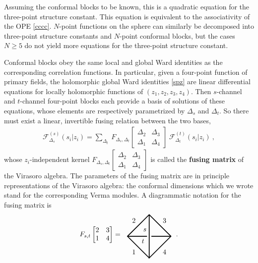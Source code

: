 \documentclass[12pt, a4paper, notitlepage, twoside]{report}
\numberwithin{equation}{section}
\theoremstyle{break}
\begin{document}
Assuming the conformal blocks to be known, this is a quadratic equation for the three-point structure constant.
This equation is equivalent to the associativity of the OPE \eqref{cccc}. $N$-point functions on the sphere can similarly be decomposed into three-point structure constants and $N$-point conformal blocks, but the cases $N\geq 5$ do not yield more equations for the three-point structure constant. 

Conformal blocks obey the same local and global Ward identities as the corresponding correlation functions.
In particular, given a four-point function of primary fields, the holomorphic global Ward identities \eqref{spz} are linear differential equations for locally holomorphic functions of $(z_1,z_2,z_3,z_4)$.
Then
$s$-channel and $t$-channel four-point blocks each provide a basis of solutions of these equations, whose elements are respectively parametrized by $\Delta_s$ and $\Delta_t$.
So there must exist a linear, invertible fusing relation between the two bases, 
\begin{align}
 \mathcal{F}^{(s)}_{\Delta_s}(s_i|z_i) = \sum_{\Delta_t}\ F_{\Delta_s,\Delta_t}\begin{bmatrix} \Delta_2 & \Delta_3 \\ \Delta_1 & \Delta_4 \end{bmatrix}\ \mathcal{F}^{(t)}_{\Delta_t}(s_i|z_i)\ ,
\end{align}
whose $z_i$-independent kernel $F_{\Delta_s,\Delta_t}\begin{bmatrix} \Delta_2 & \Delta_3 \\ \Delta_1 & \Delta_4 \end{bmatrix}$ is called the \textbf{\boldmath fusing matrix} of the Virasoro algebra.
The parameters of the fusing matrix are in principle representations of the Virasoro algebra: the conformal dimensions which we wrote stand for the corresponding Verma modules.
A diagrammatic notation for the fusing matrix is 
\begin{align}
 F_{s,t}\begin{bmatrix} 2 & 3 \\ 1 & 4 \end{bmatrix} = \ \ 
\begin{tikzpicture}[baseline=(current  bounding  box.center), very thick, scale = .55]
\draw (0, -2) -- node [below left] {$1$} (-2, 0) -- node [above left] {$2$} (0, 2) -- node [above right] {$3$} (2, 0) -- node [below right] {$4$} (0, -2) -- (0, 2);
\draw (-2, 0) -- (-.2, 0) node [below left] {$t$}; \draw (.2, 0) -- (2, 0);
\node [above left] at (0, .2) {$s$};
\end{tikzpicture}
\ \ .
\end{align}
\end{document}
